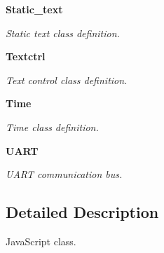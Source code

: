 \begin{DoxyCompactItemize}
\textbf{ Static\+\_\+text}
\begin{DoxyCompactList}\small\item\em Static text class definition. \end{DoxyCompactList}\item 
\textbf{ Textctrl}
\begin{DoxyCompactList}\small\item\em Text control class definition. \end{DoxyCompactList}\item 
\textbf{ Time}
\begin{DoxyCompactList}\small\item\em Time class definition. \end{DoxyCompactList}\item 
\textbf{ U\+A\+RT}
\begin{DoxyCompactList}\small\item\em U\+A\+RT communication bus. \end{DoxyCompactList}\end{DoxyCompactItemize}


\subsection{Detailed Description}
Java\+Script class. 

